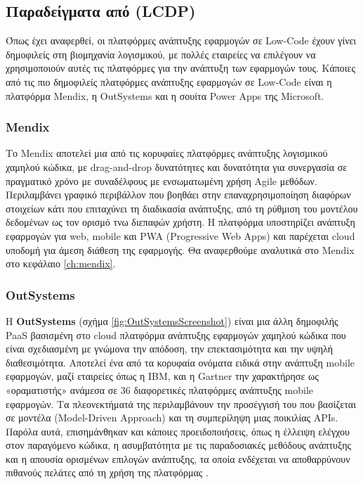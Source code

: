         \subsection{Παραδείγματα από (LCDP)}
            Όπως έχει αναφερθεί, οι πλατφόρμες ανάπτυξης εφαρμογών σε Low-Code έχουν γίνει δημοφιλείς στη βιομηχανία λογισμικού, με πολλές εταιρείες να επιλέγουν να χρησιμοποιούν αυτές τις πλατφόρμες για την ανάπτυξη των εφαρμογών τους. Κάποιες από τις πιο δημοφιλείς πλατφόρμες ανάπτυξης εφαρμογών σε Low-Code είναι η πλατφόρμα Mendix, η OutSystems και η σουίτα Power Apps της Microsoft.

            \subsubsection{Mendix}
            Το Mendix αποτελεί μια από τις κορυφαίες πλατφόρμες ανάπτυξης λογισμικού χαμηλού κώδικα, με drag-and-drop δυνατότητες και δυνατότητα για συνεργασία σε πραγματικό χρόνο με συναδέλφους με ενσωματωμένη χρήση Agile μεθόδων. Περιλαμβάνει γραφικό περιβάλλον που βοηθάει στην επαναχρησιμοποίηση διαφόρων στοιχείων κάτι που επιταχύνει τη διαδικασία ανάπτυξης, από τη ρύθμιση του μοντέλου δεδομένων ως τον ορισμό τνω διεπαφών χρήστη. Η πλατφόρμα υποστηρίζει ανάπτυξη εφαρμογών για web, mobile και PWA (Progressive Web Apps) και παρέχεται cloud υποδομή για άμεση διάθεση της εφαρμογής. Θα αναφερθούμε αναλυτικά στο Mendix στο κεφάλαιο \ref{ch:mendix}.

            \subsubsection{OutSystems}
            Η \textbf{OutSystems} (σχήμα \ref{fig:OutSystemsScreenshot}) είναι μια άλλη δημοφιλής PaaS βασισμένη στο cloud πλατφόρμα ανάπτυξης εφαρμογών χαμηλού κώδικα που είναι σχεδιασμένη με γνώμονα την απόδοση, την επεκτασιμότητα και την υψηλή διαθεσιμότητα. Αποτελεί ένα από τα κορυφαία ονόματα ειδικά στην ανάπτυξη mobile εφαρμογών, μαζί εταιρείες όπως η IBM, και η Gartner την χαρακτήρησε ως «οραματιστής» ανάμεσα σε 36 διαφορετικές πλατφόρμες ανάπτυξης mobile εφαρμογών. Τα πλεονεκτήματά της περιλαμβάνουν την προσέγγισή του που βασίζεται σε μοντέλα (Model-Driven Approach) και τη συμπερίληψη μιας ποικιλίας APIs. Παρόλα αυτά, επισημάνθηκαν και κάποιες προειδοποιήσεις, όπως η έλλειψη ελέγχου στον παραγόμενο κώδικα, η ασυμβατότητα με τις παραδοσιακές μεθόδους ανάπτυξης και η απουσία ορισμένων επιλογών ανάπτυξης, τα οποία ενδέχεται να αποθαρρύνουν πιθανούς πελάτες από τη χρήση της πλατφόρμας \cite{QuadrantOutSystems}.

